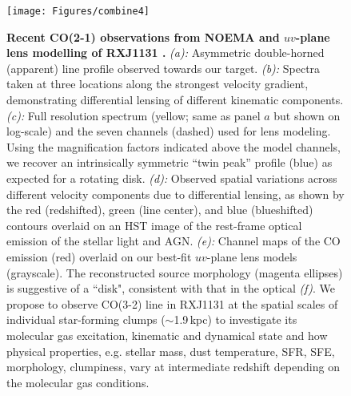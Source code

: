 \documentclass[11pt,a4paper,twoside,graphicx,color]{article}
\newcommand{\bco}{\mbox{CO(2-1)}\xspace}
\newcommand{\cco}{\mbox{CO(3-2)}\xspace}
\newcommand{\kms}{km\,s$^{-1}$\xspace}
\newcommand{\interz}{intermediate-$z$\xspace}
\newcommand{\obs}{observations\xspace}
\begin{document}
\begin{figure}[htbp]
\begin{center}
\texttt{[image: Figures/combine4]}
\caption{ 
\textbf{Recent \bco \obs from NOEMA and $uv$-plane lens modelling of RXJ1131 \citep{Leung16b}.}
{\em (a):}
Asymmetric double-horned (apparent) line profile observed towards our target.
{\em (b):}
Spectra taken at three locations along the strongest velocity gradient,
demonstrating
differential lensing of different kinematic components.
{\em (c):}
Full resolution spectrum (yellow; same as panel $a$ but shown on log-scale) and the seven channels (dashed) used for lens modeling.
Using the magnification factors indicated above the model channels, we recover an intrinsically symmetric
``twin peak'' profile (blue) as expected for a rotating disk.
{\em (d):}
Observed spatial variations across different velocity components due to
differential lensing,
as shown by the red (redshifted),
green (line center), and blue (blueshifted) contours overlaid on an 
HST image of the rest-frame optical emission of the stellar light and AGN.
{\em (e):}
Channel maps of the CO emission (red)
overlaid on our best-fit $uv$-plane lens models (grayscale).
The reconstructed source morphology (magenta ellipses) is suggestive of a ``disk", 
consistent with that in the optical {\em (f)}.
We propose to observe \cco line in RXJ1131 at the spatial scales of individual star-forming clumps ($\sim$1.9\,kpc)
to
investigate
its molecular gas excitation, kinematic and dynamical state and how
physical properties, e.g. stellar mass, dust temperature, SFR, SFE, morphology, clumpiness, 
vary at intermediate redshift depending on the molecular gas conditions.
\label{fig:combine}}
\vspace{-2.15em}
\end{center}
\end{figure}

\clearpage

\end{document}
